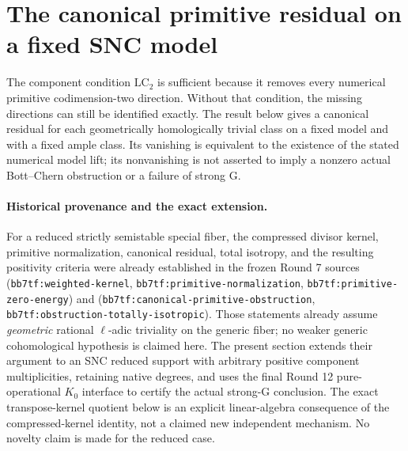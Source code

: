 \section{The canonical primitive residual on a fixed SNC model}
\label{r15res:section}

The component condition $\mathrm{LC}_2$ is sufficient because it
removes every numerical primitive codimension-two direction.
Without that condition, the missing directions can still be
identified exactly.  The result below gives a canonical residual
for each geometrically homologically trivial class on a fixed
model and with a fixed ample class.  Its vanishing is equivalent
to the existence of the stated numerical model lift; its
nonvanishing is not asserted to imply a nonzero actual
Bott--Chern obstruction or a failure of strong G.

\paragraph{Historical provenance and the exact extension.}
For a reduced strictly semistable special fiber, the compressed
divisor kernel, primitive normalization, canonical residual,
total isotropy, and the resulting positivity criteria were
already established in the frozen Round 7 sources
(\texttt{bb7tf:weighted-kernel},
\texttt{bb7tf:primitive-normalization},
\texttt{bb7tf:primitive-zero-energy}) and
(\texttt{bb7tf:canonical-primitive-obstruction},
\texttt{bb7tf:obstruction-totally-isotropic}).
Those statements already assume \emph{geometric} rational
$\ell$-adic triviality on the generic fiber; no weaker generic
cohomological hypothesis is claimed here.
The present section extends their argument to an SNC reduced
support with arbitrary positive component multiplicities,
retaining native degrees, and uses the final Round 12
pure-operational $K_0$ interface to certify the actual
strong-G conclusion.  The exact transpose-kernel quotient
below is an explicit linear-algebra consequence of the
compressed-kernel identity, not a claimed new independent
mechanism.  No novelty claim is made for the reduced case.

